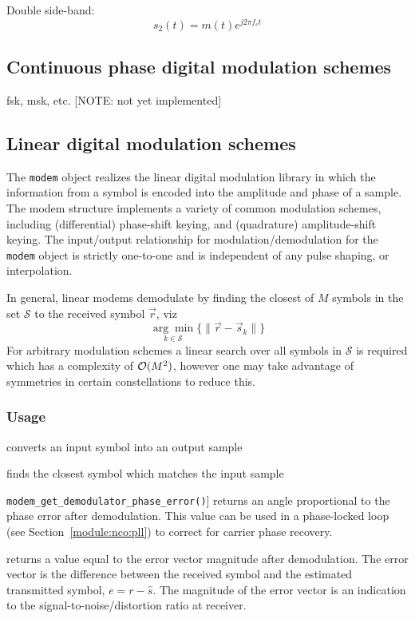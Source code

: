 Double side-band:
\[
    s_2(t) = m(t)e^{j 2 \pi f_c t}
\]

\subsection{Continuous phase digital modulation schemes}
fsk, msk, etc. [NOTE: not yet implemented]

\subsection{Linear digital modulation schemes}
\label{module:modem:digital}
The {\tt modem} object realizes the linear digital modulation library in which
the information from a symbol is encoded into the amplitude and phase of a
sample.
The modem structure implements a variety of common modulation schemes,
including (differential) phase-shift keying, and (quadrature) amplitude-shift
keying.
The input/output relationship for modulation/demodulation for the {\tt modem}
object is
strictly one-to-one and is independent of any pulse shaping, or interpolation.

In general, linear modems demodulate by finding the closest of $M$ symbols in
the set $\mathcal{S}$ to the received symbol $\vec{r}$, viz
\[
    \underset{k \in \mathcal{S}}{\arg\min}
    \bigl\{
        \| \vec{r} - \vec{s}_k \|
    \bigr\}
\]
For arbitrary modulation schemes a linear search over all symbols in
$\mathcal{S}$ is required which has a complexity of $\mathcal{O}(M^2)$, however one may
take advantage of symmetries in certain constellations to reduce this.

\subsubsection{Usage}
\begin{description}
\item[{\tt modem\_modulate()}]
    converts an input symbol into an output sample
\item[{\tt modem\_demodulate()}]
    finds the closest symbol which matches the input sample
\item {\tt modem\_get\_demodulator\_phase\_error()}]
    returns an angle proportional to the phase error after demodulation.
    This value can be used in a phase-locked loop
    (see Section~\ref{module:nco:pll})
    to correct for carrier phase recovery.
\item[{\tt modem\_get\_demodulator\_evm()}]
    returns a value equal to the error vector magnitude after demodulation.
    The error vector is the difference between the received symbol and the
    estimated transmitted symbol, $e = r - \hat{s}$.
    The magnitude of the error vector is an indication to the
    signal-to-noise/distortion ratio at receiver.
\end{description}

